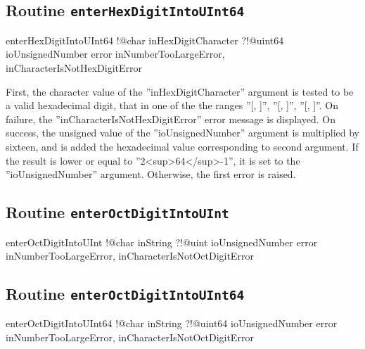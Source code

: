 {\subsection{Routine \texttt{enterHexDigitIntoUInt64}}

\begin{galgascode}
enterHexDigitIntoUInt64 !@char inHexDigitCharacter
                        ?!@uint64 ioUnsignedNumber
                        error inNumberTooLargeError,
                              inCharacterIsNotHexDigitError
\end{galgascode}

First, the character value of the ''inHexDigitCharacter'' argument is tested to be a valid hexadecimal digit, that in one of the the ranges ''[\textquotesingle, \textquotesingle]'', ''[\textquotesingle, \textquotesingle]'', ''[\textquotesingle, \textquotesingle]''. On failure, the ''inCharacterIsNotHexDigitError'' error message is displayed. On success, the unsigned value of the ''ioUnsignedNumber'' argument is multiplied by sixteen, and is added the hexadecimal value corresponding to second argument. If the result is lower or equal to ''2<sup>64</sup>-1'', it is set to the ''ioUnsignedNumber'' argument. Otherwise, the first error is raised.

\subsection{Routine \texttt{enterOctDigitIntoUInt}}

\begin{galgascode}
enterOctDigitIntoUInt !@char inString
                      ?!@uint ioUnsignedNumber
                      error inNumberTooLargeError,
                            inCharacterIsNotOctDigitError
\end{galgascode}

\subsection{Routine \texttt{enterOctDigitIntoUInt64}}

\begin{galgascode}
enterOctDigitIntoUInt64 !@char inString
                        ?!@uint64 ioUnsignedNumber
                        error inNumberTooLargeError,
                              inCharacterIsNotOctDigitError
\end{galgascode}

}
